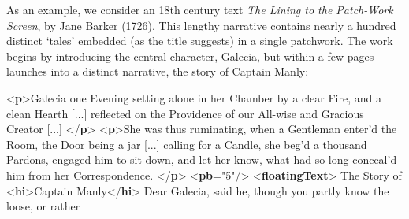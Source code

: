 As an example, we consider an 18th century text \textit{The Lining to the {\itshape Patch-Work Screen}}, by Jane Barker (1726). This lengthy narrative contains nearly a hundred distinct ‘tales’ embedded (as the title suggests) in a single patchwork. The work begins by introducing the central character, Galecia, but within a few pages launches into a distinct narrative, the story of Captain Manly: \par\bgroup{}\exampleFont \begin{shaded}\noindent\mbox{}{<\textbf{p}>}Galecia one Evening setting alone in her Chamber by a clear Fire,\mbox{}\newline 
 and a clean Hearth [...] reflected on the Providence of our\mbox{}\newline 
 All-wise and Gracious Creator [...] {</\textbf{p}>}\mbox{}\newline 
{<\textbf{p}>}She was thus ruminating, when a Gentleman enter'd the Room, the\mbox{}\newline 
 Door being a jar [...] calling for a Candle, she beg'd a thousand\mbox{}\newline 
 Pardons, engaged him to sit down, and let her know, what had so long\mbox{}\newline 
 conceal'd him from her Correspondence.\mbox{}\newline 
{</\textbf{p}>}\mbox{}\newline 
{<\textbf{pb}\hspace*{1em}{n}="{5}"/>}\mbox{}\newline 
{<\textbf{floatingText}>}\mbox{}\newline 
{}\mbox{}\newline 
\hspace*{1em}The Story of {<\textbf{hi}>}Captain Manly{</\textbf{hi}>}\mbox{}\newline 
\hspace*{1em}\mbox{}\newline 
\hspace*{1em}Dear Galecia, said he, though you partly know the loose, or rather\mbox{}\newline 

\end{shaded}
